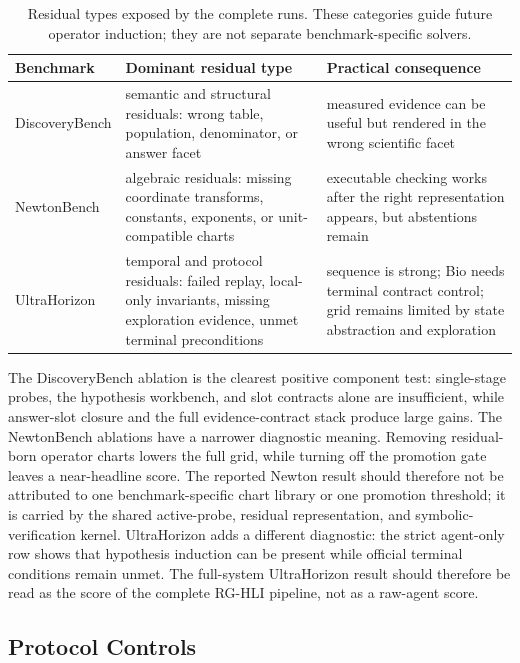 \documentclass[letterpaper]{article}
\newcommand{\tblhdr}{\rowcolor{headerrow}}
\newcommand{\methodshort}{\textsc{RG-HLI}\xspace}
\begin{document}
\begin{table}[H]
\centering
\caption{Residual types exposed by the complete runs. These categories guide
future operator induction; they are not separate benchmark-specific solvers.}
\label{tab:failure_modes}
\small
\setlength{\tabcolsep}{5pt}
\begin{tabularx}{0.96\textwidth}{@{}lYY@{}}
\toprule
\tblhdr
Benchmark & Dominant residual type & Practical consequence \\
\midrule
DiscoveryBench & semantic and structural residuals: wrong table, population, denominator, or answer facet & measured evidence can be useful but rendered in the wrong scientific facet \\
NewtonBench & algebraic residuals: missing coordinate transforms, constants, exponents, or unit-compatible charts & executable checking works after the right representation appears, but abstentions remain \\
UltraHorizon & temporal and protocol residuals: failed replay, local-only invariants, missing exploration evidence, unmet terminal preconditions & sequence is strong; Bio needs terminal contract control; grid remains limited by state abstraction and exploration \\
\bottomrule
\end{tabularx}
\end{table}

The DiscoveryBench ablation is the clearest positive component test:
single-stage probes, the hypothesis workbench, and slot contracts alone are
insufficient, while answer-slot closure and the full evidence-contract stack
produce large gains. The NewtonBench ablations have a narrower diagnostic
meaning. Removing residual-born operator charts lowers the full grid, while
turning off the promotion gate leaves a near-headline score. The reported
Newton result should therefore not be attributed to one benchmark-specific
chart library or one promotion threshold; it is carried by the shared
active-probe, residual representation, and symbolic-verification kernel.
UltraHorizon
adds a different diagnostic: the strict agent-only row shows that hypothesis
induction can be present while official terminal conditions remain unmet. The
full-system UltraHorizon result should therefore be read as the score of the
complete \methodshort pipeline, not as a raw-agent score.

\subsection*{Protocol Controls}
\end{document}
